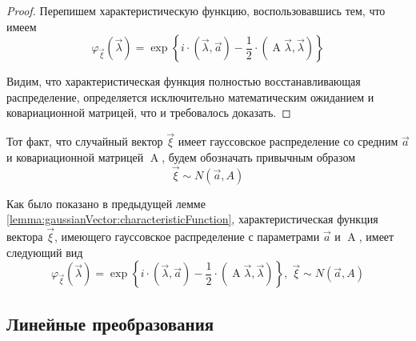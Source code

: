 \begin{proof}
    Перепишем характеристическую функцию, воспользовавшись тем, что имеем
    $$\varphi_{\vec{\xi}}\left( \vec{\lambda} \right)
        = \exp{\left\{ i \cdot \left( \vec{\lambda}, \vec{a} \right)
            - \frac{1}{2} \cdot \left( \operatorname{A} \vec{\lambda} ,
                \vec{\lambda} \right) \right\}}$$

    Видим, что характеристическая функция полностью восстанавливающая
    распределение, определяется исключительно математическим ожиданием
    и ковариационной матрицей, что и требовалось доказать.
\end{proof}

\begin{definition}
    Тот факт, что случайный вектор $\vec{\xi}$ имеет гауссовское распределение
    со средним $\vec{a}$ и ковариационной матрицей
    $\operatorname{A}$, будем обозначать привычным образом
    $$\vec{\xi} \sim N\left( \vec{a}, A \right)$$
\end{definition}

\begin{remark}
    \label{remark:gaussianVector:characteristicFunction}
    Как было показано в предыдущей лемме
    \ref{lemma:gaussianVector:characteristicFunction}, характеристическая
    функция вектора $\vec{\xi}$, имеющего гауссовское распределение с
    параметрами $\vec{a}$ и $\operatorname{A}$, имеет следующий вид
    $$\varphi_{\vec{\xi}}\left( \vec{\lambda} \right)
        = \exp{\left\{ i \cdot \left( \vec{\lambda}, \vec{a} \right)
            - \frac{1}{2} \cdot \left( \operatorname{A} \vec{\lambda} ,
                \vec{\lambda} \right) \right\}},\;
        \vec{\xi} \sim N\left( \vec{a}, A \right)$$
\end{remark}

\subsection{Линейные преобразования}

